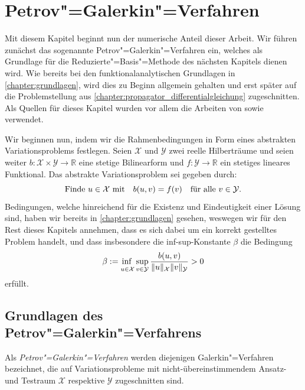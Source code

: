 \documentclass[../main.tex]{subfiles}
\begin{document}
\chapter{Petrov"=Galerkin"=Verfahren} %
\label{chapter:galerkin}

Mit diesem Kapitel beginnt nun der numerische Anteil dieser Arbeit.
Wir führen zunächst das sogenannte Petrov"=Galerkin"=Verfahren ein, welches als Grundlage für die Reduzierte"=Basis"=Methode des nächsten Kapitels dienen wird.
Wie bereits bei den funktionalanalytischen Grundlagen in \cref{chapter:grundlagen}, wird dies zu Beginn allgemein gehalten und erst später auf die Problemstellung aus \cref{chapter:propagator_differentialgleichung} zugeschnitten.
Als Quellen für dieses Kapitel wurden vor allem die Arbeiten von \textcite{Nochetto:2009il} sowie \textcite{Braess:2007wm} verwendet.

Wir beginnen nun, indem wir die Rahmenbedingungen in Form eines abstrakten Variationsproblems festlegen.
Seien $\mathcal X$ und $\mathcal Y$ zwei reelle Hilberträume und seien weiter $b \colon \mathcal X \times \mathcal Y \to \mathbb{R}$ eine stetige Bilinearform und $f \colon \mathcal Y \to \mathbb{R}$ ein stetiges lineares Funktional.
Das abstrakte Variationsproblem sei gegeben durch:
\begin{equation}\label{eq:galerkin_abstraktes_variationsproblem}
    \text{Finde}~u \in \mathcal X \text{ mit} \quad  b(u, v) = f(v) \quad \fa v \in \mathcal Y.
\end{equation}
Bedingungen, welche hinreichend für die Existenz und Eindeutigkeit einer Lösung sind, haben wir bereits in \cref{chapter:grundlagen} gesehen, weswegen wir für den Rest dieses Kapitels annehmen, dass es sich dabei um ein korrekt gestelltes Problem handelt, und dass insbesondere die inf-sup-Konstante $\beta$ die Bedingung
\begin{equation}\label{eq:galerkin_abstraktes_variationsproblem_infsup_bedingung}
    \beta := \infsup{u \in \mathcal X}{v \in \mathcal Y} \frac{b(u, v)}{\norm{u}_{\mathcal X} \norm{v}_{\mathcal Y}} > 0
\end{equation}
erfüllt.


\section{Grundlagen des Petrov"=Galerkin"=Verfahrens} %
\label{section:petrov_galerkin_grundlagen}

Als \emph{Petrov"=Galerkin"=Verfahren} werden diejenigen Galerkin"=Verfahren bezeichnet, die auf Variationsprobleme mit nicht-übereinstimmendem Ansatz- und Testraum $\mathcal X$ respektive $\mathcal Y$ zugeschnitten sind.
\end{document}
